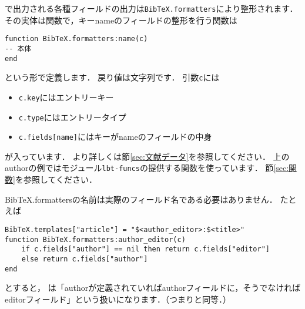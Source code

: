 \documentclass[a4paper]{ltjsarticle}
\newcommand*{\luavar}[1]{\texttt{#1}}
\begin{document}
で出力される各種フィールドの出力は\luavar{BibTeX.formatters}により整形されます．%
その実体は関数で，キーnameのフィールドの整形を行う関数は
\begin{lstlisting}
function BibTeX.formatters:name(c)
-- 本体
end
\end{lstlisting}
という形で定義します．
戻り値は文字列です．
引数\luavar{c}には
\begin{itemize}
\item \luavar{c.key}にはエントリーキー
\item \luavar{c.type}にはエントリータイプ
\item \luavar{c.fields[name]}にはキーがnameのフィールドの中身
\end{itemize}
が入っています．
より詳しくは節\ref{sec:文献データ}を参照してください．
上のauthorの例ではモジュール\luavar{lbt-funcs}の提供する関数を使っています．
節\ref{sec:関数}を参照してください．

BibTeX.formattersの名前は実際のフィールド名である必要はありません．
たとえば
\begin{lstlisting}
BibTeX.templates["article"] = "$<author_editor>:$<title>"
function BibTeX.formatters:author_editor(c)
    if c.fields["author"] == nil then return c.fields["editor"]
    else return c.fields["author"]
end
\end{lstlisting}
とすると，%
は「authorが定義されていればauthorフィールドに，そうでなければeditorフィールド」という扱いになります．（つまりと同等．）%
\end{document}
